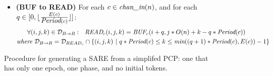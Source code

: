 \begin{figure}[t]
{\begin{minipage}{6.3in}
\begin{itemize}
\begin{align}
  \mt{WRITE}_{c}(i, q, j - q * U(c)) \\ \nonumber
&\mt{where } {\cal D}_{W \rightarrow B}(c,q) = 
  {\cal D}_{{BUF}_{c}} \cap 
  \{ (i,j)~|~q*U(c) \le j \le (q+1)*U(c) - 1 \}
\end{align}
\item {\bf(BUF to READ)} For each $c \in \mbox{\it chan\_in}(n)$, 
       and for each $q \in [0, \lfloor \frac{E(c)}{\mbox{\it Period}(c)} \rfloor ]$:
\begin{align}
\label{eq:b2r}
&~~~~~\forall (i,j,k) \in {\cal D}_{B \rightarrow R}:~~
\mbox{\it READ}_{c}(i,j,k) = \mbox{\it BUF}_{c}(i+q,j*O(n) + k - q * \mbox{\it Period}(c)) \\ \nonumber
&\mbox{\it where }{\cal D}_{B \rightarrow R} = 
  {\cal D}_{READ_{c}} \cap \{ (i,j,k)~|~q * \mbox{\it Period}(c) \le k \le \mbox{\it min}((q+1)*\mbox{\it Period}(c), E(c)) - 1 \}
\end{align}
\end{itemize}
\end{minipage}}
\caption{Procedure for generating a SARE from a simplifed PCP:  one that has only one epoch, one phase, and no initial tokens.
\protect\label{fig:sdftosare}}
\end{figure}





